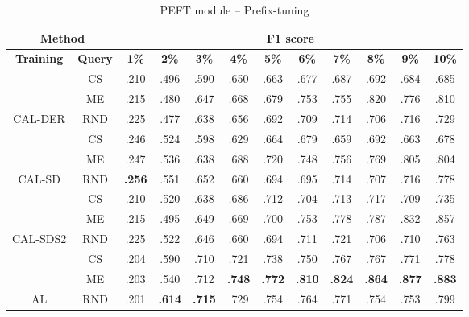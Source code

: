 \begin{table}[htbp]
\begin{subtable}{\linewidth}
\begin{tabular}{c|c|cccccccccc}
\toprule
\multicolumn{2}{c|}{\textbf{Method}} & \multicolumn{10}{c}{\textbf{F1 score}} \\
\midrule
\textbf{Training} & \textbf{Query} & \textbf{1\%} & \textbf{2\%} & \textbf{3\%} & \textbf{4\%} & \textbf{5\%} & \textbf{6\%} & \textbf{7\%} & \textbf{8\%} & \textbf{9\%} & \textbf{10\%}\\
\midrule
 & CS & .210 & .496 & .590 & .650 & .663 & .677 & .687 & .692 & .684 & .685\\

 & ME & .215 & .480 & .647 & .668 & .679 & .753 & .755 & .820 & .776 & .810\\

\multirow{-3}{*}{\raggedright\arraybackslash CAL-DER} & RND & .225 & .477 & .638 & .656 & .692 & .709 & .714 & .706 & .716 & .729\\
\midrule
 & CS & .246 & .524 & .598 & .629 & .664 & .679 & .659 & .692 & .663 & .678\\

 & ME & .247 & .536 & .638 & .688 & .720 & .748 & .756 & .769 & .805 & .804\\

\multirow{-3}{*}{\raggedright\arraybackslash CAL-SD} & RND & \textbf{.256} & .551 & .652 & .660 & .694 & .695 & .714 & .707 & .716 & .778\\
\midrule
 & CS & .210 & .520 & .638 & .686 & .712 & .704 & .713 & .717 & .709 & .735\\

 & ME & .215 & .495 & .649 & .669 & .700 & .753 & .778 & .787 & .832 & .857\\

\multirow{-3}{*}{\raggedright\arraybackslash CAL-SDS2} & RND & .225 & .522 & .646 & .660 & .694 & .711 & .721 & .706 & .710 & .763\\
\midrule
 & CS & .204 & .590 & .710 & .721 & .738 & .750 & .767 & .767 & .771 & .778\\

 & ME & .203 & .540 & .712 & \textbf{.748} & \textbf{.772} & \textbf{.810} & \textbf{.824} & \textbf{.864} & \textbf{.877} & \textbf{.883}\\

\multirow{-3}{*}{\raggedright\arraybackslash AL} & RND & .201 & \textbf{.614} & \textbf{.715} & .729 & .754 & .764 & .771 & .754 & .753 & .799\\
\bottomrule
\end{tabular}
\end{subtable}
\vspace{1em}
\begin{subtable}{\linewidth}
\centering
\caption{PEFT module -- Prefix-tuning}


\end{subtable}
\end{table}
